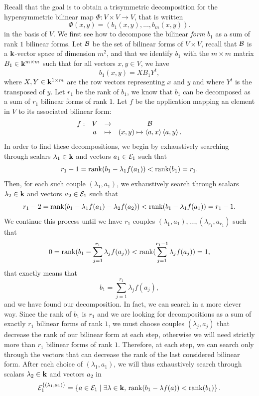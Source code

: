 Recall that the goal is to obtain a trisymmetric decomposition for the
hypersymmetric bilinear map $\Phi:V\times V\to V$, that is written
\[
  \Phi(x, y) = (b_1(x, y), \dots, b_m(x, y)).
\]
in the basis of $V$. We first see how to decompose the bilinear \emph{form}
$b_1$ as a sum of rank $1$ bilinear forms. Let $\mathcal{B}$ be the set of bilinear forms
of $V\times V$, recall that $\mathcal{B}$ is a $\mathbf{k}$-vector space of dimension $m^2$, and
that we identify $b_1$ with the $m\times m$ matrix $B_1\in\mathbf{k}^{m\times m}$ 
such that for all vectors $x, y\in V$, we have
\[
  b_1(x, y) = X B_1 Y^t,
\]
where $X, Y\in\mathbf{k}^{1\times m}$ are the row vectors representing $x$ and $y$ and
where $Y^t$ is the transposed of $y$. Let $r_1$ be the rank of $b_1$, we know
that $b_1$ can be decomposed as a sum of $r_1$ bilinear forms of rank $1$. Let
$f$ be the application mapping an element in $V$ to its associated bilinear
form:
\[
  \begin{array}{cccc}
    f: & V & \to & \mathcal{B}\\
    & a & \mapsto & (x, y)\mapsto\left\langle a,x\right\rangle\left\langle a,y\right\rangle.
  \end{array}
\]
In order to find these decompositions, we begin by exhaustively searching through scalars $\lambda_1\in\mathbf{k}$ and vectors
$a_1\in \mathcal{E}_1$ such that
\[
  r_1-1=\operatorname{rank}(b_1-\lambda_1 f(a_1)) < \operatorname{rank}(b_1)=r_1.
\]
Then, for each such couple $(\lambda_1, a_1)$, we exhaustively search through
scalars $\lambda_2\in\mathbf{k}$ and vectors $a_2\in \mathcal{E}_1$ such that
\[
  r_1-2=\operatorname{rank}(b_1-\lambda_1 f(a_1)-\lambda_2f(a_2)) < \operatorname{rank}(b_1-\lambda_1
  f(a_1))=r_1-1.
\]
We continue this process until we have $r_1$ couples $(\lambda_1, a_1), \dots,
(\lambda_{r_1}, a_{r_1})$ such that
\[
  0 = \operatorname{rank}(b_1-\sum_{j=1}^{r_1}\lambda_jf(a_j)) <
  \operatorname{rank}(\sum_{j=1}^{r_1-1}\lambda_jf(a_j)) = 1,
\]
that exactly means that
\[
  b_1 = \sum_{j=1}^{r_1}\lambda_jf(a_j),
\]
and we have found our decomposition.
In fact, we can search in a more clever way. Since the rank of $b_1$ is $r_1$
and we are looking for decompositions as a sum of exactly $r_1$ bilinear forms of
rank $1$, we must choose
couples $(\lambda_j, a_j)$ that decrease the rank of our bilinear form at each
step, otherwise we will need strictly more than $r_1$ bilinear forms of rank
$1$. Therefore, at each step, we can search only through the vectors that can
decrease the rank of the last considered bilinear form. After each choice of
$(\lambda_1, a_1)$, we will thus exhaustively search through scalars
$\lambda_2\in\mathbf{k}$ and vectors $a_2$ in
\[
  \mathcal{E}_1^{\left\{ (\lambda_1, a_1) \right\}} = \left\{
  a\in\mathcal{E}_1\;|\;\exists\lambda\in\mathbf{k},\,\operatorname{rank}(b_1-\lambda f(a)) <\operatorname{rank}(b_1)
\right\}.
\]

